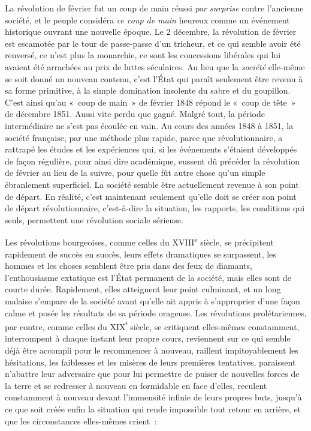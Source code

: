 \documentclass[french,twoside]{book} %
\begin{document}
La révolution de février fut un coup de main réussi \emph{par surprise} contre l’ancienne société, et le peuple considéra \emph{ce coup de main} heureux comme un événement historique ouvrant une nouvelle époque. Le 2 décembre, la révolution de février est escamotée par le tour de passe-passe d’un tricheur, et ce qui semble avoir été renversé, ce n’est plus la monarchie, ce sont les concessions libérales qui lui avaient été arrachées au prix de luttes séculaires. Au lieu que la \emph{société} elle-même se soit donné un nouveau contenu, c’est l’État qui paraît seulement être revenu à sa forme primitive, à la simple domination insolente du sabre et du goupillon. C’est ainsi qu’au « coup de main » de février 1848 répond le « coup de tête » de décembre 1851. Aussi vite perdu que gagné. Malgré tout, la période intermédiaire ne s’est pas écoulée en vain. Au cours des années 1848 à 1851, la société française, par une méthode plus rapide, parce que révolutionnaire, a rattrapé les études et les expériences qui, si les événements s’étaient développés de façon régulière, pour ainsi dire académique, eussent dû précéder la révolution de février au lieu de la suivre, pour quelle fût autre chose qu’un simple ébranlement superficiel. La société semble être actuellement revenue à son point de départ. En réalité, c’est maintenant seulement qu’elle doit se créer son point de départ révolutionnaire, c’est-à-dire la situation, les rapports, les conditions qui seuls, permettent une révolution sociale sérieuse.\par
Les révolutions bourgeoises, comme celles du XVIII\textsuperscript{e} siècle, se précipitent rapidement de succès en succès, leurs effets dramatiques se surpassent, les hommes et les choses semblent être pris dans des feux de diamants, l’enthousiasme extatique est l’État permanent de la société, mais elles sont de courte durée. Rapidement, elles atteignent leur point culminant, et un long malaise s’empare de la société avant qu’elle ait appris à s’approprier d’une façon calme et posée les résultats de sa période orageuse. Les révolutions prolétariennes, par contre, comme celles du XIX\textsuperscript{ᵉ} siècle, se critiquent elles-mêmes constamment, interrompent à chaque instant leur propre cours, reviennent sur ce qui semble déjà être accompli pour le recommencer à nouveau, raillent impitoyablement les hésitations, les faiblesses et les misères de leurs premières tentatives, paraissent n’abattre leur adversaire que pour lui permettre de puiser de nouvelles forces de la terre et se redresser à nouveau en formidable en face d’elles, reculent constamment à nouveau devant l’immensité infinie de leurs propres buts, jusqu’à ce que soit créée enfin la situation qui rende impossible tout retour en arrière, et que les circonstances elles-mêmes crient :\par
\end{document}
